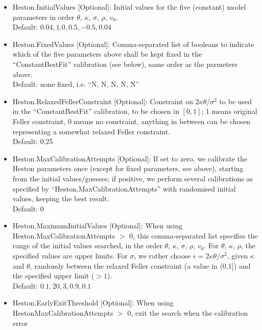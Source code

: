 \begin{itemize}
\begin{itemize}
    option volatility surface; these are used for an initial guess of model parameters $\theta$, $\kappa$ and $v_0$. \\
    Can be left blank which means we skip this step of generating initial guesses. \\
    Default: empty list
  \item Heston.InitialValues [Optional]: Initial values for the five (constant) model parameters in order $\theta$, $\kappa$, $\sigma$,
    $\rho$, $v_0$. \\
    Default: $0.04, 1.0, 0.5, -0.5, 0.04$
  \item Heston.FixedValues [Optional]: Comma-separated list of booleans to indicate which of the five parameters above shall be kept
    fixed in the ``ConstantBestFit'' calibration (see below), same order as the parmeters above. \\
    Default: none fixed, i.e. ``N, N, N, N, N''
  \item Heston.RelaxedFellerConstraint [Optional]: Constraint on $2\kappa\theta/\sigma^2$ to be used in the ``ConstantBestFit''
    calibration, to be chosen in $[0,1]$; 1 means original Feller constraint, 0 means no constraint, anything in between
    can be chosen representing a somewhat relaxed Feller constraint. \\
    Default: 0.25 
  \item Heston.MaxCalibrationAttempts [Optional]: If set to zero, we calibrate the Heston
    parameters once (except for fixed parameters, see above), starting from the initial values/guesses; if positive,
    we perform several calibrations as specified by ``Heston.MaxCalibrationAttempts'' with randomised initial values, keeping the best result. \\
    Default: 0
  \item Heston.MaximumInitialValues [Optional]: When using Heston.MaxCalibrationAttempts $>$ 0,  this comma-separated list specifies the range of the
    initial values searched, in the order $\theta$, $\kappa$, $\sigma$, $\rho$, $v_0$. For $\theta$, $\kappa$, $\rho$,
    the specified values are upper limits. For $\sigma$, we rather choose $\epsilon = 2\kappa\theta/\sigma^2$, given $\kappa$
    and $\theta$, randomly between the relaxed Feller constraint (a value in (0,1]) and the specified upper limit ($>1$). \\
    Default: $0.1, 20, 3, 0.9, 0.1$
  \item Heston.EarlyExitThreshold [Optional]: When using HestonMaxCalibrationAttempts $>$ 0, exit the search when the calibration error

\end{itemize}
\end{itemize}
